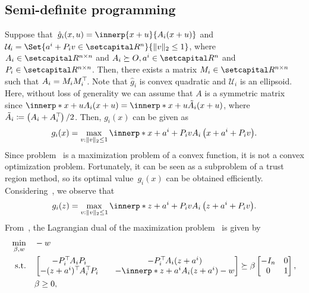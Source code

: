 \documentclass[../../main]{subfiles}
\begin{document}
\subsection{Semi-definite programming} 
Suppose that~$\hat{g}_i (x,u) = \innerp{x + u}{A_i (x + u)}$ and ${\mathcal{U}}_i = \Set{ a^i + P_i v \in \setR^n }{\norm{v}_2 \leq 1 }$, where $A_i \in \setR^{n \times n}$ and $A_i \succeq O, a^i \in \setR^n$ and $P_i \in \setR^{n \times n}$. 
Then, there exists a matrix $M_i \in \setR^{n \times n}$ such that $A_i = M_i M_i^\top\hspace{-1pt}$. 
Note that $\hat{g}_i$ is convex quadratic and $\mathcal{U}_i$ is an ellipsoid. 
Here, without loss of generality we can assume that $A$ is a symmetric matrix since $\innerp*{x + u}{A_i (x + u)} = \innerp*{x + u}{\tilde{A}_i (x + u)}$, where $\tilde{A}_i \coloneqq \left(A_i+A_i^\top\hspace{-1pt}\right) / 2$. Then, $g_i(x)$ can be given as
\begin{equation} \label{eq:sdp_g_i}
    g_i(x) = \max_{v : \norm{v}_2 \leq 1} \innerp*{x + a^i + P_i v}{A_i \left(x + a^i + P_i v\right)}.
\end{equation}
Since problem~ is a maximization problem of a convex function, it is not a convex optimization problem. Fortunately, it can be seen as a subproblem of a trust region method, so its optimal value~$g_i(x)$ can be obtained efficiently. Considering~, we observe that
\begin{equation} \label{eq:sdp_g_i_}
    g_i(z) = \max_{v : \norm{v}_2 \leq 1} \innerp*{z + a^i + P_i v}{A_i \left(z + a^i + P_i v\right)}.
\end{equation}
From~\cite[Section~3]{Beck2006}, the Lagrangian dual of the maximization problem~ is given by
\begin{equation}\label{eq:dual}
    \begin{aligned} 
        \min_{\beta, w} \quad   & -w \\ 
        \st    \quad   & 
        \begin{bmatrix}
            -P_i^\T A_i P_i &\quad -P_i^\T A_i (z + a^i) \\
            -(z + a^i)^\T A_i^\T P_i &\quad -\innerp*{z + a^i}{A_i (z + a^i)} - w
        \end{bmatrix}
        \succeq
        \beta \begin{bmatrix}
            -I_n & 0 \\
            0 & 1
        \end{bmatrix}, \\
                       & \beta \geq 0,
    \end{aligned}
\end{equation}
\end{document}
